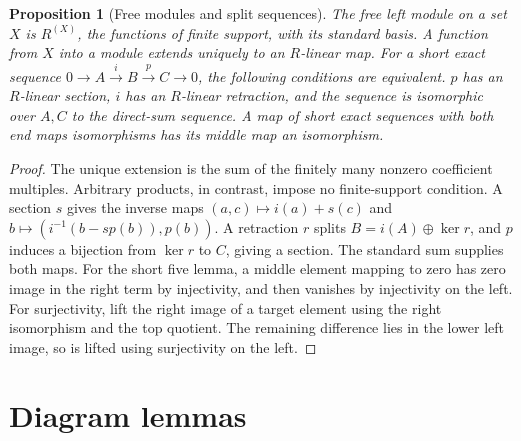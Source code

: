 \documentclass[11pt,oneside,openany]{book}
\newtheorem{proposition}[theorem]{Proposition}
\theoremstyle{definition}
\theoremstyle{remark}
\begin{document}
\begin{proposition}[Free modules and split sequences]\label{p103:ALG-03-C01-S01}
The free left module on a set \(X\) is \(R^{(X)}\), the functions
of finite support, with its standard basis. A function from \(X\)
into a module extends uniquely to an \(R\)-linear map.
For a short exact sequence \(0\to A\xrightarrow{i} B
\xrightarrow{p} C\to0\), the following conditions are equivalent.
\(p\) has an \(R\)-linear section, \(i\) has an \(R\)-linear
retraction, and the sequence is isomorphic over \(A,C\) to the
direct-sum sequence. A map of short exact sequences with both end
maps isomorphisms has its middle map an isomorphism.
\end{proposition}
\begin{proof}
The unique extension is the sum of the finitely many nonzero
coefficient multiples. Arbitrary products, in contrast, impose no
finite-support condition. A section \(s\) gives the inverse maps
\((a,c)\mapsto i(a)+s(c)\) and
\(b\mapsto (i^{-1}(b-sp(b)),p(b))\). A retraction \(r\) splits
\(B=i(A)\oplus\ker r\), and \(p\) induces a bijection from \(\ker r\)
to \(C\), giving a section. The standard sum supplies both maps.
For the short five lemma, a middle element mapping to zero has
zero image in the right term by injectivity, and then vanishes by
injectivity on the left. For surjectivity, lift the right image of
a target element using the right isomorphism and the top quotient.
The remaining difference lies in the lower left image, so is lifted
using surjectivity on the left.
\end{proof}

\section{Diagram lemmas}
\end{document}
